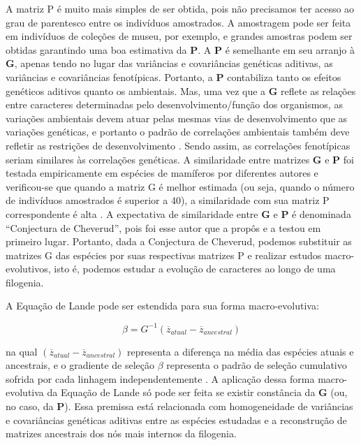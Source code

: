 \documentclass[portuges,]{tufte-handout}
\begin{document}
A matriz P é muito mais simples de ser obtida, pois não precisamos ter
acesso ao grau de parentesco entre os indivíduos amostrados. A
amostragem pode ser feita em indivíduos de coleções de museu, por
exemplo, e grandes amostras podem ser obtidas garantindo uma boa
estimativa da $\mathbf{P}$. A $\mathbf{P}$ é semelhante em seu arranjo à
$\mathbf{G}$, apenas tendo no lugar das variâncias e covariâncias
genéticas aditivas, as variâncias e covariâncias fenotípicas. Portanto,
a $\mathbf{P}$ contabiliza tanto os efeitos genéticos aditivos quanto os
ambientais. Mas, uma vez que a $\mathbf{G}$ reflete as relações entre
caracteres determinadas pelo desenvolvimento/função dos organismos, as
variações ambientais devem atuar pelas mesmas vias de desenvolvimento
que as variações genéticas, e portanto o padrão de correlações
ambientais também deve refletir as restrições de desenvolvimento
\cite{Cheverud1984}. Sendo assim, as correlações fenotípicas seriam
similares às correlações genéticas. A similaridade entre matrizes
$\mathbf{G}$ e $\mathbf{P}$ foi testada empiricamente em espécies de
mamíferos por diferentes autores e verificou-se que quando a matriz G é
melhor estimada (ou seja, quando o número de indivíduos amostrados é
superior a 40), a similaridade com sua matriz P correspondente é alta
\cite{Cheverud1988}. A expectativa de similaridade entre
$\mathbf{G}$ e $\mathbf{P}$ é denominada ``Conjectura de Cheverud'',
pois foi esse autor que a propôs e a testou em primeiro lugar. Portanto,
dada a Conjectura de Cheverud, podemos substituir as matrizes G das
espécies por suas respectivas matrizes P e realizar estudos
macro-evolutivos, isto é, podemos estudar a evolução de caracteres ao
longo de uma filogenia.

A Equação de Lande pode ser estendida para sua forma macro-evolutiva:

\[
\beta = G^{-1} (\overline z_{atual} - \overline z_{ancestral})
\]

na qual $(\overline z_{atual} - \overline z_{ancestral})$ representa a
diferença na média das espécies atuais e ancestrais, e o gradiente de
seleção $\beta$ representa o padrão de seleção cumulativo sofrida por
cada linhagem independentemente \cite{Marroig2005}. A aplicação
dessa forma macro-evolutiva da Equação de Lande só pode ser feita se
existir constância da $\mathbf{G}$ (ou, no caso, da $\mathbf{P}$). Essa
premissa está relacionada com homogeneidade de variâncias e covariâncias
genéticas aditivas entre as espécies estudadas e a reconstrução de
matrizes ancestrais dos nós mais internos da filogenia.
\end{document}
